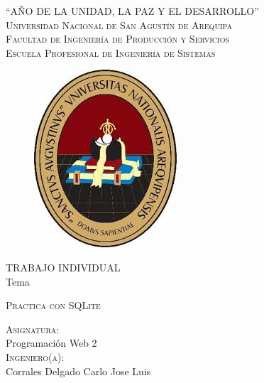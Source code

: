 \documentclass[oneside,letterpaper]{article}            %
\newcommand{\itemYear}{AÑO DE LA UNIDAD, LA PAZ Y EL DESARROLLO}
\newcommand{\itemRType}{TRABAJO INDIVIDUAL}
\newcommand{\itemCourseG}{Programación Web 2}
\newcommand{\itemTheme}{Practica con SQLite}
\newcommand{\itemTeacher}{Corrales Delgado Carlo Jose Luis}
\begin{document}
\begin{titlepage}
    \centering
    \begin{spacing}{1.7}
        \Large{``\itemYear''}\\ %
        \Large {\textsc{Universidad Nacional de San Agustín de Arequipa}}\\ 
        \large{\textsc{Facultad de Ingeniería de Producción  y Servicios}\\
        \textsc{Escuela Profesional de Ingeniería de Sistemas}}
        \normalsize
    \end{spacing}
    
    \vspace{0.5cm}
    
    \begin{figure}[h!]
        \begin{center}
            \includegraphics[scale=0.67]{images/IN.jpg} 
        \end{center}
    \end{figure}
    
    \itemRType\\ %
    \vspace{0.35cm}
    Tema\\
    \vspace{0.5cm}
    \begin{spacing}{1}
        \Large{\textsc{\itemTheme}}
    \end{spacing}
    \vspace{0.5cm}
    \textsc{Asignatura:}\\\vspace{0.35cm}
    \itemCourseG
    \\\vspace{0.5cm}
    \textsc{Ingeniero(a):}\\\vspace{0.35cm}
    \itemTeacher
    

\end{titlepage}
\end{document}
